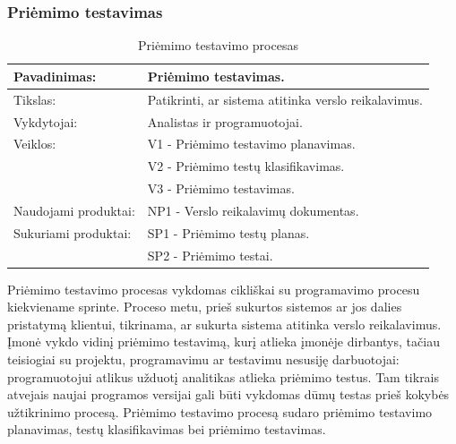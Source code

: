 \documentclass{VUMIFPSkursinis}
\begin{document}
	\subsubsection{Priėmimo testavimas}
	\begin{center}
		\begin{table}[ht]
		\caption{Priėmimo testavimo procesas}
		\begin{tabular}{ | l | l | } 
		\hline
		Pavadinimas:         & Priėmimo testavimas.                                       \\ \hline
		Tikslas: 	           & Patikrinti, ar sistema atitinka verslo reikalavimus. \\ \hline
		Vykdytojai:          & Analistas ir programuotojai.                                \\ \hline
		Veiklos:             & V1 - Priėmimo testavimo planavimas.													\\
						             & V2 - Priėmimo testų klasifikavimas.					 \\
					 	             & V3 - Priėmimo testavimas. 														\\ \hline
		Naudojami produktai: & NP1 - Verslo reikalavimų dokumentas. 																				\\ \hline
		Sukuriami produktai: & SP1 - Priėmimo testų planas. 																								\\
												 & SP2 - Priėmimo testai.																	 \\ \hline
		\end{tabular}
	\end{table}
		\end{center}
	Priėmimo testavimo procesas vykdomas cikliškai su programavimo procesu kiekviename sprinte. Proceso metu, prieš sukurtos sistemos ar jos dalies pristatymą klientui, tikrinama, ar sukurta sistema atitinka verslo reikalavimus. Įmonė vykdo vidinį priėmimo testavimą, kurį atlieka įmonėje dirbantys, tačiau teisiogiai su projektu, programavimu ar testavimu nesusiję darbuotojai: programuotojui atlikus užduotį analitikas atlieka priėmimo testus. Tam tikrais atvejais naujai programos versijai gali būti vykdomas dūmų testas prieš kokybės užtikrinimo procesą. Priėmimo testavimo procesą sudaro priėmimo testavimo planavimas, testų klasifikavimas bei priėmimo testavimas.
\end{document}
